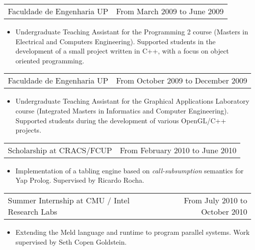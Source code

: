 \documentclass[margin]{res}
\begin{document}
\begin{resume}
                 \begin{tabular}{p{3in} r} %
                  Faculdade de Engenharia UP &  From March 2009 to June 2009
                 \end{tabular}
                  \begin{itemize}					        
                   \item[] Undergraduate Teaching Assistant for the Programming 2 course (Masters in Electrical and Computers Engineering). Supported students in the development of a small project written in C++, with a focus on object oriented programming.
                  \end{itemize}
                  
                  \begin{tabular}{p{3in} r} %
                    Faculdade de Engenharia UP &  From October 2009 to December 2009
                   \end{tabular}
                    \begin{itemize}					        
                     \item[] Undergraduate Teaching Assistant for the Graphical Applications Laboratory course (Integrated Masters in Informatics and Computer Engineering). Supported students during the development of various OpenGL/C++ projects.
                    \end{itemize}
                    
                  \begin{tabular}{p{3in} r}
                    Scholarship at CRACS/FCUP & From February 2010 to June 2010
                  \end{tabular}
                  \begin{itemize}
                    \item[] Implementation of a tabling engine based on \textit{call-subsumption} semantics for Yap Prolog. Supervised by Ricardo Rocha.
                  \end{itemize}
                  
                  \begin{tabular}{p{3in} r}
                    Summer Internship at CMU / Intel Research Labs & From July 2010 to October 2010
                  \end{tabular}
                  \begin{itemize}
                    \item[] Extending the Meld language and runtime to program parallel systems. Work supervised by Seth Copen Goldstein.
                  \end{itemize}
                  \clearpage
                  

\end{resume}
\end{document}

